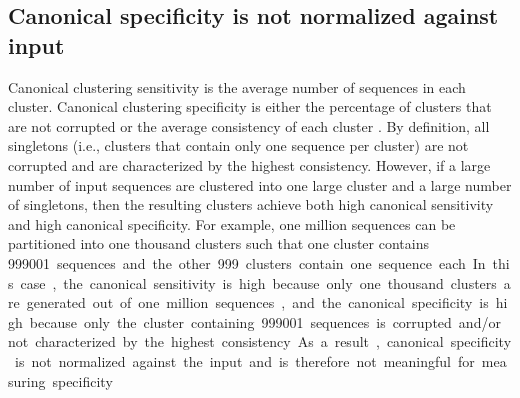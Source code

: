 \documentclass{bioinfo}
\begin{document}
\subsection{Canonical specificity is not normalized against input}
\label{sec:appendix:canonical-specificity}
Canonical clustering sensitivity is the average number of sequences in each cluster.
Canonical clustering specificity is either the percentage of clusters that are not corrupted \citep{hauser2013kclust} or the average consistency of each cluster \citep{hauser2016mmseqs,steinegger2017mmseqs2,steinegger2017linclust}.
By definition, all singletons (i.e., clusters that contain only one sequence per cluster) are not corrupted and are characterized by the highest consistency.
However, if a large number of input sequences are clustered into one large cluster and a large number of singletons, then the resulting clusters achieve both high canonical sensitivity and high canonical specificity.
For example, one million sequences can be partitioned into one thousand clusters such that one cluster contains \SI{999001} sequences and the other \SI{999} clusters contain one sequence each.
In this case, 
the canonical sensitivity is high because only one thousand clusters are generated out of one million sequences, 
and the canonical specificity is high because only the cluster containing \SI{999001} sequences is corrupted and/or not characterized by the highest consistency.
As a result, canonical specificity is not normalized against the input and is therefore not meaningful for measuring specificity.

\clearpage{}
\end{document}

